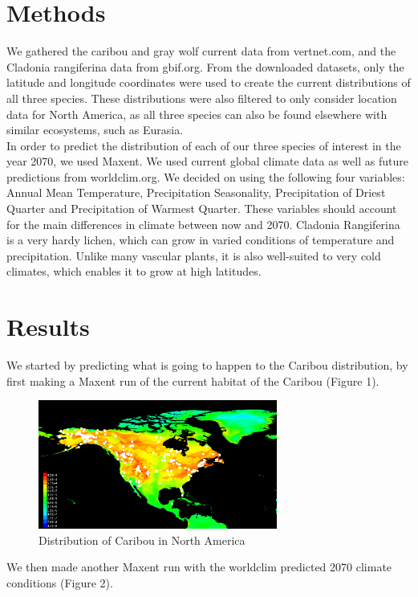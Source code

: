\documentclass[twoside]{article}
\begin{document}
\section{Methods}
We gathered the caribou and gray wolf current data from vertnet.com,
and the Cladonia rangiferina data from gbif.org. From the downloaded datasets,
only the latitude and longitude coordinates were used to create the current
distributions of all three species. These distributions were also filtered
to only consider location data for North America, as all three species can
also be found elsewhere with similar ecosystems, such as Eurasia. \\
In order to predict the distribution of each of our three species of interest
in the year 2070, we used Maxent. We used current global climate data as well
as future predictions from worldclim.org.  We decided on using the following
four variables:  Annual Mean Temperature, Precipitation Seasonality,
Precipitation of Driest Quarter and Precipitation of Warmest Quarter.
These variables should account for the main differences in climate between now
and 2070. Cladonia Rangiferina is a very hardy lichen, which can grow in varied
conditions of temperature and precipitation. Unlike many vascular plants, it is
also well-suited to very cold climates, which enables it to grow at
high latitudes.



\section{Results}
We started by predicting what is going to happen to the Caribou distribution, by
first making a Maxent run of the current habitat of the Caribou (Figure 1).

\begin{figure}[h!]
\centering
\includegraphics[width=0.7\textwidth]{NCaribouPresent}
\caption{Distribution of Caribou in North America}
\end{figure}

We then made another Maxent run with the worldclim predicted 2070 climate
conditions (Figure 2).
\end{document}
